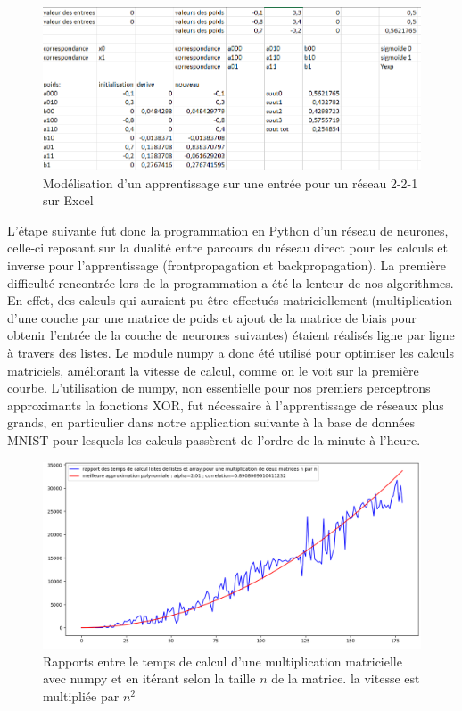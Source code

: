 \documentclass[
    10pt,
    a4paper,
    oneside,
    headinclude,footinclude,
    BCOR=5mm,
    captions=tableabove
]{scrartcl}
\begin{document}
\begin{figure}[!h]
\includegraphics[width=\linewidth]{excelXOR.png}
\centering
\caption{Modélisation d'un apprentissage sur une entrée pour un réseau 2-2-1 sur Excel}
\label{fig:excelXOR}
\end{figure}

L'étape suivante fut donc la programmation en Python d'un réseau de neurones, celle-ci reposant sur la dualité entre parcours du réseau direct pour les calculs et inverse pour l'apprentissage (frontpropagation et backpropagation). La première difficulté rencontrée lors de la programmation a été la lenteur de nos algorithmes. En effet, des calculs qui auraient pu être effectués matriciellement (multiplication d'une couche par une matrice de poids et ajout de la matrice de biais pour obtenir l'entrée de la couche de neurones suivantes) étaient réalisés ligne par ligne à travers des listes. Le module numpy a donc été utilisé pour optimiser les calculs matriciels, améliorant la vitesse de calcul, comme on le voit sur la première courbe. L'utilisation de numpy, non essentielle pour nos premiers perceptrons approximants la fonctions XOR, fut nécessaire à l'apprentissage de réseaux plus grands, en particulier dans notre application suivante à la base de données MNIST pour lesquels les calculs passèrent de l'ordre de la minute à l'heure.

\begin{figure}[h!]
\includegraphics[width=\linewidth]{tpsCalcul.png}
\centering
\caption{Rapports entre le temps de calcul d'une multiplication matricielle avec numpy et en itérant selon la taille $n$ de la matrice. la vitesse est multipliée par  $n^{2}$ }
\label{fig:tpsCalcul}
\end{figure}
\end{document}
